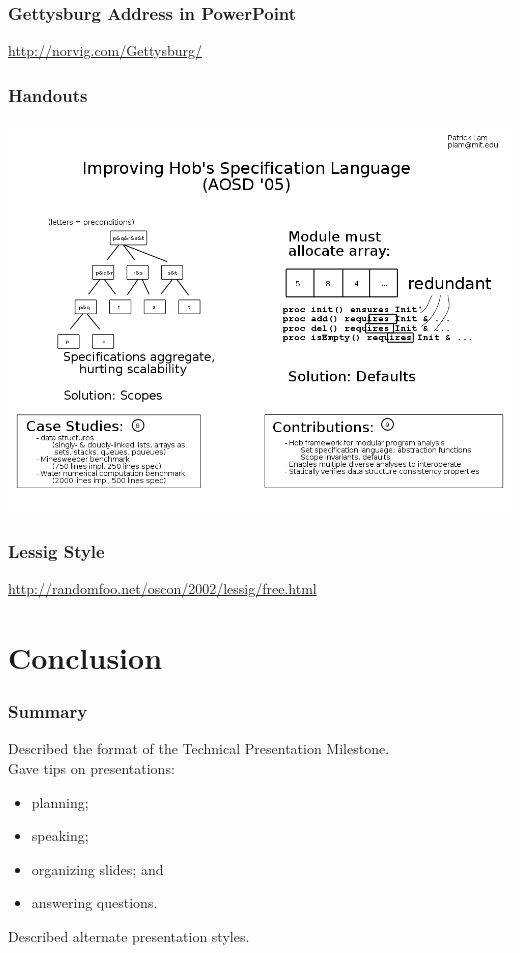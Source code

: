 \documentclass{beamer}
\begin{document}
\begin{frame}
\frametitle{Gettysburg Address in PowerPoint}

\begin{center}
\url{http://norvig.com/Gettysburg/}
\end{center}

\end{frame}

\begin{frame}
\frametitle{Handouts}

\begin{center}
\includegraphics[height=.8\textheight]{x-handout2}
\end{center}

\end{frame}

\begin{frame}
\frametitle{Lessig Style}

\small
\begin{center}
\url{http://randomfoo.net/oscon/2002/lessig/free.html}
\end{center}

\end{frame}

\section{Conclusion}

\begin{frame}
\frametitle{Summary}

Described the format of the Technical Presentation Milestone.\\[1em]

Gave tips on presentations:

\begin{itemize}
\item planning;
\item speaking;
\item organizing slides; and
\item answering questions.
\end{itemize}

Described alternate presentation styles.

\end{frame}
\end{document}
